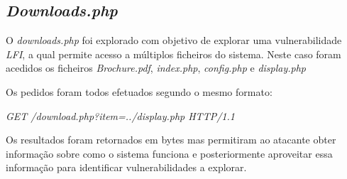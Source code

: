 \documentclass[10pt,english]{article}
\begin{document}
\subsection{\textit{Downloads.php}}
\par O \textit{downloads.php} foi explorado com objetivo de explorar uma vulnerabilidade \textit{LFI}, a qual permite acesso a múltiplos ficheiros do sistema. Neste caso foram acedidos os ficheiros \textit{Brochure.pdf}, \textit{index.php}, \textit{config.php} e \textit{display.php}
\par Os pedidos foram todos efetuados segundo o mesmo formato:
\par \textit{GET /download.php?item=../display.php HTTP/1.1}
\bigskip
\par Os resultados foram retornados em bytes mas permitiram ao atacante obter informação sobre como o sistema funciona e posteriormente aproveitar essa informação para identificar vulnerabilidades a explorar.
\end{document}
